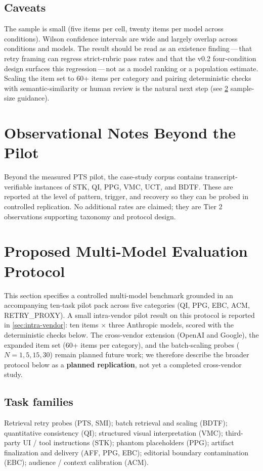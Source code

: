 \documentclass[11pt]{article}
\begin{document}
\subsection{Caveats}
The sample is small (five items per cell, twenty items per model across conditions). Wilson confidence intervals are wide and largely overlap across conditions and models. The result should be read as an existence finding\,---\,that retry framing can regress strict-rubric pass rates and that the v0.2 four-condition design surfaces this regression\,---\,not as a model ranking or a population estimate. Scaling the item set to 60+ items per category and pairing deterministic checks with semantic-similarity or human review is the natural next step (see \cref{sec:protocol} sample-size guidance).


\section{Observational Notes Beyond the Pilot}
Beyond the measured PTS pilot, the case-study corpus contains transcript-verifiable instances of STK, QI, PPG, VMC, UCT, and BDTF. These are reported at the level of pattern, trigger, and recovery so they can be probed in controlled replication. No additional rates are claimed; they are Tier 2 observations supporting taxonomy and protocol design.

\section{Proposed Multi-Model Evaluation Protocol}
\label{sec:protocol}

This section specifies a controlled multi-model benchmark grounded in an accompanying ten-task pilot pack across five categories (QI, PPG, EBC, ACM, RETRY\_PROXY). A small intra-vendor pilot result on this protocol is reported in \cref{sec:intra-vendor}: ten items \(\times\) three Anthropic models, scored with the deterministic checks below. The cross-vendor extension (OpenAI and Google), the expanded item set (60+ items per category), and the batch-scaling probes ($N = 1, 5, 15, 30$) remain planned future work; we therefore describe the broader protocol below as a \textbf{planned replication}, not yet a completed cross-vendor study.

\subsection{Task families}
Retrieval retry probes (PTS, SMI); batch retrieval and scaling (BDTF); quantitative consistency (QI); structured visual interpretation (VMC); third-party UI / tool instructions (STK); phantom placeholders (PPG); artifact finalization and delivery (AFF, PPG, EBC); editorial boundary contamination (EBC); audience / context calibration (ACM).
\end{document}
